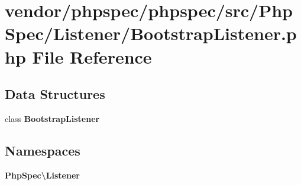 \section{vendor/phpspec/phpspec/src/\+Php\+Spec/\+Listener/\+Bootstrap\+Listener.php File Reference}
\label{_bootstrap_listener_8php}
\subsection*{Data Structures}
\begin{DoxyCompactItemize}
\item 
class {\bf Bootstrap\+Listener}
\end{DoxyCompactItemize}
\subsection*{Namespaces}
\begin{DoxyCompactItemize}
\item 
 {\bf Php\+Spec\textbackslash{}\+Listener}
\end{DoxyCompactItemize}

